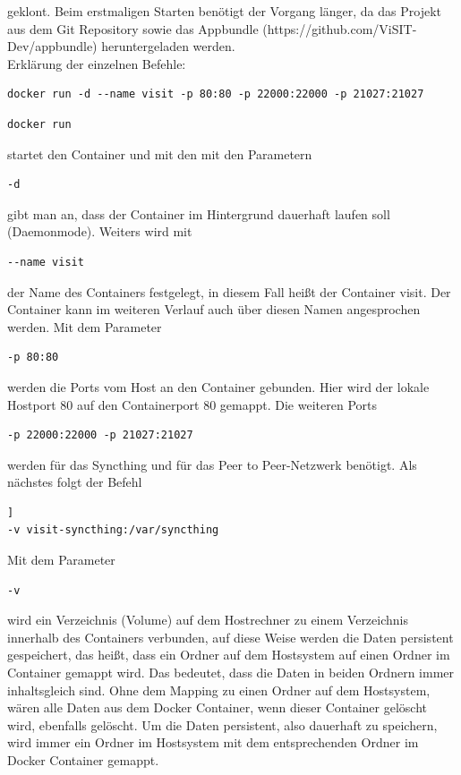 geklont. Beim erstmaligen Starten benötigt der Vorgang länger, da das Projekt aus dem Git Repository sowie das Appbundle (https://github.com/ViSIT-Dev/appbundle) heruntergeladen werden.\\

Erklärung der einzelnen Befehle:\\
\begin{lstlisting}[style=MyBashStyle,caption={Docker run-Befehl}]
docker run -d --name visit -p 80:80 -p 22000:22000 -p 21027:21027 
\end{lstlisting}

\begin{lstlisting}[style=MyBashStyle,caption={docker run}]
docker run 
\end{lstlisting}
 startet den Container und mit den mit den Parametern \begin{lstlisting}[style=MyBashStyle,caption={-d}]
-d 
\end{lstlisting} gibt man an, dass der Container im Hintergrund dauerhaft laufen soll (Daemonmode). Weiters wird mit \begin{lstlisting}[style=MyBashStyle,caption={--name visit}]
--name visit
\end{lstlisting} der Name des Containers festgelegt, in diesem Fall heißt der Container visit. Der Container kann im weiteren Verlauf auch über diesen Namen angesprochen werden.
Mit dem Parameter
\begin{lstlisting}[style=MyBashStyle,caption={-p}]
-p 80:80
\end{lstlisting} werden die Ports vom Host an den Container gebunden. Hier wird der lokale Hostport 80 auf den Containerport 80 gemappt. Die weiteren Ports 
\begin{lstlisting}[style=MyBashStyle,caption={-p}]
-p 22000:22000 -p 21027:21027 
\end{lstlisting} werden für das Syncthing und für das Peer to Peer-Netzwerk benötigt.
Als nächstes folgt der Befehl 
\begin{lstlisting}[style=MyBashStyle,caption={-v visit-syncthing}]]
-v visit-syncthing:/var/syncthing
\end{lstlisting}
Mit dem Parameter \begin{lstlisting}[style=MyBashStyle,caption={-v} ]
-v
\end{lstlisting}
 wird ein Verzeichnis (Volume) auf dem Hostrechner zu einem Verzeichnis innerhalb des Containers verbunden, auf diese Weise werden die Daten persistent gespeichert, das heißt, dass ein Ordner auf dem Hostsystem auf einen Ordner im Container gemappt wird. Das bedeutet, dass die Daten in beiden Ordnern immer inhaltsgleich sind. Ohne dem Mapping zu einen Ordner auf dem Hostsystem, wären alle Daten aus dem Docker Container, wenn dieser Container gelöscht wird, ebenfalls gelöscht. Um die Daten persistent, also dauerhaft zu speichern, wird immer ein Ordner im Hostsystem mit dem entsprechenden Ordner im Docker Container gemappt.
